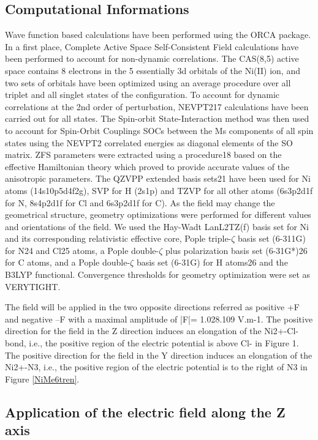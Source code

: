 \documentclass[10pt]{report}
\numberwithin{equation}{section}
\begin{document}
\subsection{Computational Informations}
Wave function based calculations have been performed using the ORCA package.
In a first place, Complete Active Space Self-Consistent Field calculations have been performed to account for non-dynamic correlations. 
The CAS(8,5) active space contains 8 electrons in the 5 essentially 3d orbitals of the Ni(II) ion, and two sets of orbitals have been optimized using an average procedure over all triplet and all singlet states of the configuration.
To account for dynamic correlations at the 2nd order of perturbation, NEVPT217 calculations have been carried out for all states. 
The Spin-orbit State-Interaction method was then used to account for Spin-Orbit Couplings SOCs between the Ms components of all spin states using the NEVPT2 correlated energies as diagonal elements of the SO matrix. 
ZFS parameters were extracted using a procedure18 based on the effective Hamiltonian theory which proved to provide accurate values of the anisotropic parameters. 
The QZVPP extended basis sets21 have been used for Ni atoms (14s10p5d4f2g), SVP for H (2s1p) and TZVP for all other atoms (6s3p2d1f for N, 8s4p2d1f for Cl and 6s3p2d1f for C). 
As the field may change the geometrical structure, geometry optimizations were performed for different values and orientations of the field. 
We used the Hay-Wadt LanL2TZ(f) basis set for Ni and its corresponding relativistic effective core, Pople triple-$\zeta$ basis set (6-311G) for N24 and Cl25 atoms, a Pople double-$\zeta$ plus polarization basis set (6-31G*)26 for C atoms, and a Pople double-$\zeta$ basis set (6-31G) for H atoms26 and the B3LYP functional.
Convergence thresholds for geometry optimization were set as VERYTIGHT.

The field will be applied in the two opposite directions referred as positive +F and negative –F with a maximal amplitude of |F|= 1.028.109 V.m-1.
The positive direction for the field in the Z direction induces an elongation of the Ni2+-Cl- bond, i.e., the positive region of the electric potential is above Cl- in Figure 1. 
The positive direction for the field in the Y direction induces an elongation of the Ni2+-N3, i.e., the positive region of the electric potential is to the right of N3 in Figure \ref{NiMe6tren}.

\subsection{Application of the electric field along the Z axis}
\end{document}
